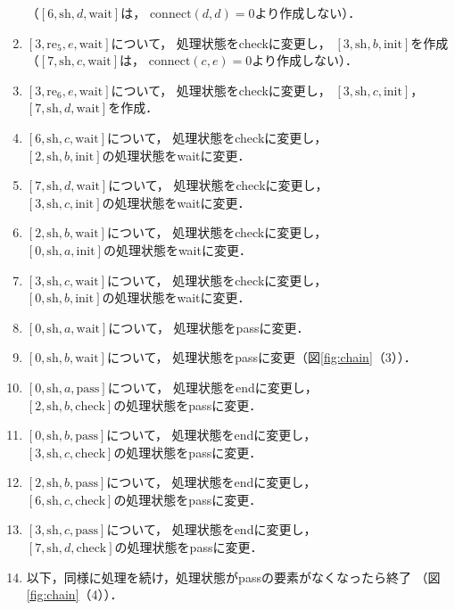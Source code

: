 \documentclass[japanese]{jnlp_1.4}
\begin{document}
\begin{enumerate}
  （$[6,\mathrm{sh},d,\mbox{wait}]$は，
  $\mathrm{connect}(d,d)=0$より作成しない）．
\item $[3,\mathrm{re}_5,e,\mbox{wait}]$について，
  処理状態をcheckに変更し，
  $[3,\mathrm{sh},b,\mbox{init}]$を作成\\
  （$[7,\mathrm{sh},c,\mbox{wait}]$は，
  $\mathrm{connect}(c,e)=0$より作成しない）．
\item $[3,\mathrm{re}_6,e,\mbox{wait}]$について，
  処理状態をcheckに変更し，
  $[3,\mathrm{sh},c,\mbox{init}]$，
  $[7,\mathrm{sh},d,\mbox{wait}]$を作成．
\item $[6,\mathrm{sh},c,\mbox{wait}]$について，
  処理状態をcheckに変更し，\\
  $[2,\mathrm{sh},b,\mbox{init}]$の処理状態をwaitに変更．
\item $[7,\mathrm{sh},d,\mbox{wait}]$について，
  処理状態をcheckに変更し，\\
  $[3,\mathrm{sh},c,\mbox{init}]$の処理状態をwaitに変更．
\item $[2,\mathrm{sh},b,\mbox{wait}]$について，
  処理状態をcheckに変更し，\\
  $[0,\mathrm{sh},a,\mbox{init}]$の処理状態をwaitに変更．
\item $[3,\mathrm{sh},c,\mbox{wait}]$について，
  処理状態をcheckに変更し，\\
  $[0,\mathrm{sh},b,\mbox{init}]$の処理状態をwaitに変更．
\item $[0,\mathrm{sh},a,\mbox{wait}]$について，
  処理状態をpassに変更．
\item $[0,\mathrm{sh},b,\mbox{wait}]$について，
  処理状態をpassに変更（図\ref{fig:chain}（3））．
\item $[0,\mathrm{sh},a,\mbox{pass}]$について，
  処理状態をendに変更し，\\
  $[2,\mathrm{sh},b,\mbox{check}]$の処理状態をpassに変更．
\item $[0,\mathrm{sh},b,\mbox{pass}]$について，
  処理状態をendに変更し，\\
  $[3,\mathrm{sh},c,\mbox{check}]$の処理状態をpassに変更．
\item $[2,\mathrm{sh},b,\mbox{pass}]$について，
  処理状態をendに変更し，\\
  $[6,\mathrm{sh},c,\mbox{check}]$の処理状態をpassに変更．
\item $[3,\mathrm{sh},c,\mbox{pass}]$について，
  処理状態をendに変更し，\\
  $[7,\mathrm{sh},d,\mbox{check}]$の処理状態をpassに変更．
\item 以下，同様に処理を続け，処理状態がpassの要素がなくなったら終了
（図\ref{fig:chain}（4））．
\end{enumerate}
\end{document}
